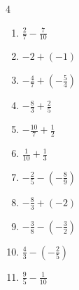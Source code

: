 \begin{multicols}{4}
\begin{enumerate}

  \item $\displaystyle \frac{2}{7} - \frac{7}{10}$


  \item $\displaystyle -2 + \left(-1\right)$

        \phantom{$\displaystyle =-3$}

  \item $\displaystyle -\frac{4}{7} + \left(-\frac{5}{4}\right)$


  \item $\displaystyle -\frac{8}{3} + \frac{2}{5}$


  \item $\displaystyle -\frac{10}{7} + \frac{1}{2}$


  \item $\displaystyle \frac{1}{10} + \frac{1}{3}$


  \item $\displaystyle -\frac{2}{5} - \left(-\frac{8}{9}\right)$


  \item $\displaystyle -\frac{8}{3} + \left(-2\right)$


\columnbreak %

\resetques

  \item $\displaystyle -\frac{3}{8} - \left(-\frac{3}{2}\right)$


  \item $\displaystyle \frac{4}{3} - \left(-\frac{2}{5}\right)$


  \item $\displaystyle \frac{9}{5} - \frac{1}{10}$



\end{enumerate}
\end{multicols}
